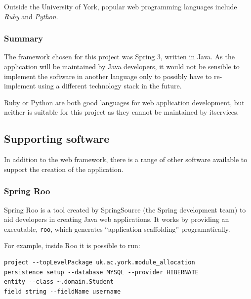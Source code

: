 \documentclass[draft]{scrartcl}
\begin{document}

Outside the University of York, popular web programming languages include
\emph{Ruby} and \emph{Python}.

% 
% 

\subsubsection{Summary}

The framework chosen for this project was Spring 3, written in Java. As the
application will be maintained by Java developers, it would not be sensible to
implement the software in another language only to possibly have to
re-implement using a different technology stack in the future.

Ruby or Python are both good languages for web application development, but
neither is suitable for this project as they cannot be maintained by
\gls{itservices}.

\subsection{Supporting software}

In addition to the web framework, there is a range of other software available
to support the creation of the application.

\subsubsection{Spring Roo}

Spring Roo is a tool created by SpringSource (the Spring development team) to
aid developers in creating Java web applications. It works by providing an
executable, \texttt{roo}, which generates ``application scaffolding''
programatically.

For example, inside Roo it is possible to run:

\begin{lstlisting}
project --topLevelPackage uk.ac.york.module_allocation
persistence setup --database MYSQL --provider HIBERNATE
entity --class ~.domain.Student
field string --fieldName username
\end{lstlisting}
\end{document}
